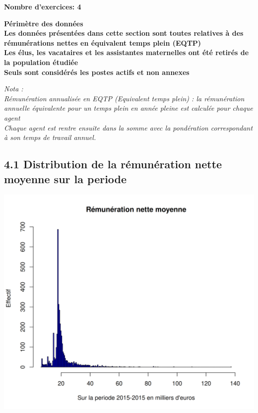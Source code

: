 \textbf{Nombre d'exercices: 4 }

\textbf{Périmètre des données}\\
\textbf{Les données présentées dans cette section sont toutes relatives
à des rémunérations nettes en équivalent temps plein (EQTP)}\\
\textbf{Les élus, les vacataires et les assistantes maternelles ont été
retirés de la population étudiée}\\
\textbf{Seuls sont considérés les postes actifs et non annexes}

\emph{Nota :}\\
\emph{Rémunération annualisée en EQTP (Equivalent temps plein) : la
rémunération annuelle équivalente pour un temps plein en année pleine
est calculée pour chaque agent}\\
\emph{Chaque agent est rentre ensuite dans la somme avec la pondération
correspondant à son temps de travail annuel. }

\hypertarget{distribution-de-la-remuneration-nette-moyenne-sur-la-periode}{%
\subsection{4.1 Distribution de la rémunération nette moyenne sur la
periode}\label{distribution-de-la-remuneration-nette-moyenne-sur-la-periode}}

\includegraphics{altair_files/figure-latex/unnamed-chunk-115-1.png}

